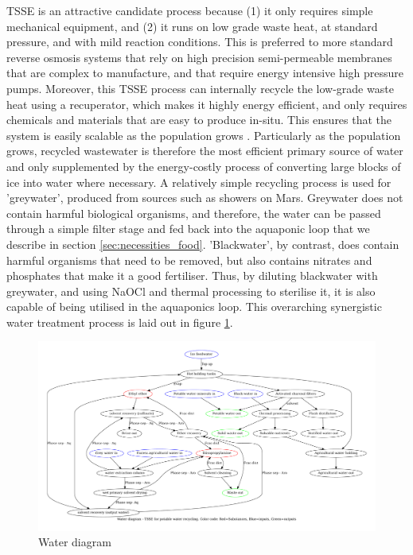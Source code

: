 \documentclass[fleqn,10pt]{Stylesheet} %
\begin{document}
 TSSE is an attractive candidate process because (1) it only requires simple mechanical equipment, and (2) it runs on low grade waste heat, at standard pressure, and with mild reaction conditions. This is preferred to more standard reverse osmosis systems that rely on high precision semi-permeable membranes that are complex to manufacture, and that require energy intensive high pressure pumps. Moreover, this TSSE process can internally recycle the low-grade waste heat using a recuperator, which makes it highly energy efficient, and only requires chemicals and materials that are easy to produce in-situ. This ensures that the system is easily scalable as the population grows \cite{ChanheeBoo2019}. Particularly as the population grows, recycled wastewater is therefore the most efficient primary source of water and only supplemented by the energy-costly process of converting large blocks of ice into water where necessary. A relatively simple recycling process is used for 'greywater', produced from sources such as showers on Mars. Greywater does not contain harmful biological organisms, and therefore, the water can be passed through a simple filter stage and fed back into the aquaponic loop that we describe in section \ref{sec:necessities_food}. 'Blackwater', by contrast, does contain harmful organisms that need to be removed, but also contains nitrates and phosphates that make it a good fertiliser. Thus, by diluting blackwater with greywater, and using NaOCl and thermal processing to sterilise it, it is also capable of being utilised in the aquaponics loop. This overarching synergistic water treatment process is laid out in figure \ref{fig:water_diagram}.

\begin{figure}
    \centering
    \includegraphics[width=\linewidth]{figures/fig_water.pdf}
    \caption{Water diagram}
    \label{fig:water_diagram}
\end{figure}
\end{document}
